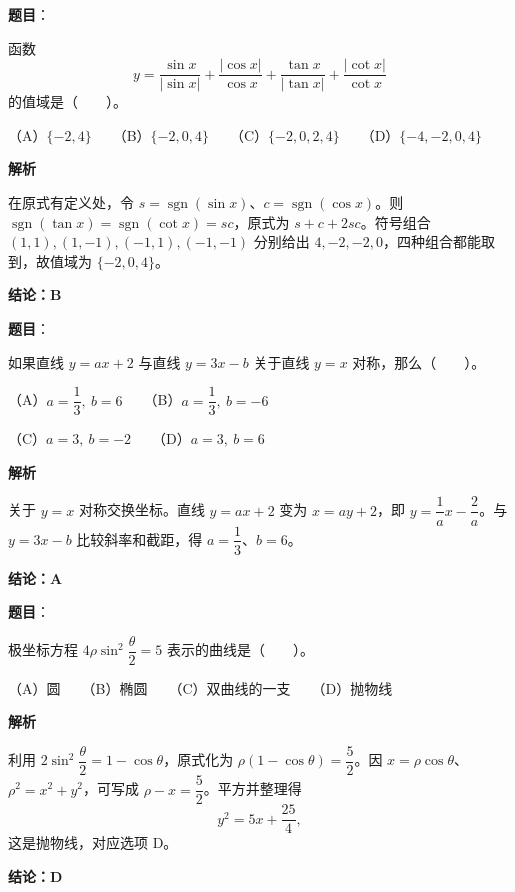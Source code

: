 \begin{answer}

\textbf{题目}：

函数
\nopagebreak[4]
\[
y=\frac{\sin x}{|\sin x|}+\frac{|\cos x|}{\cos x}+\frac{\tan x}{|\tan x|}+\frac{|\cot x|}{\cot x}
\]
的值域是\mbox{（　　）}。

（A）$\{-2,4\}$　　（B）$\{-2,0,4\}$　　（C）$\{-2,0,2,4\}$　　（D）$\{-4,-2,0,4\}$

\textbf{解析}

在原式有定义处，令 $s=\operatorname{sgn}(\sin x)$、$c=\operatorname{sgn}(\cos x)$。则 $\operatorname{sgn}(\tan x)=\operatorname{sgn}(\cot x)=sc$，原式为 $s+c+2sc$。符号组合 $(1,1),(1,-1),(-1,1),(-1,-1)$ 分别给出 $4,-2,-2,0$，四种组合都能取到，故值域为 $\{-2,0,4\}$。

\textbf{结论：B}


\end{answer}
\begin{answer}

\textbf{题目}：

如果直线 $y=ax+2$ 与直线 $y=3x-b$ 关于直线 $y=x$ 对称，那么\mbox{（　　）}。

（A）$a=\dfrac13,\ b=6$　　（B）$a=\dfrac13,\ b=-6$

（C）$a=3,\ b=-2$　　（D）$a=3,\ b=6$

\textbf{解析}

关于 $y=x$ 对称交换坐标。直线 $y=ax+2$ 变为 $x=ay+2$，即 $y=\dfrac1a x-\dfrac2a$。与 $y=3x-b$ 比较斜率和截距，得 $a=\dfrac13$、$b=6$。

\textbf{结论：A}


\end{answer}
\begin{answer}

\textbf{题目}：

极坐标方程 $4\rho\sin^2\dfrac\theta2=5$ 表示的曲线是\mbox{（　　）}。

（A）圆　　（B）椭圆　　（C）双曲线的一支　　（D）抛物线

\textbf{解析}

利用 $2\sin^2\dfrac\theta2=1-\cos\theta$，原式化为 $\rho(1-\cos\theta)=\dfrac52$。因 $x=\rho\cos\theta$、$\rho^2=x^2+y^2$，可写成 $\rho-x=\dfrac52$。平方并整理得
\nopagebreak[4]
\[
y^2=5x+\frac{25}{4},
\]
这是抛物线，对应选项 D。

\textbf{结论：D}


\end{answer}
